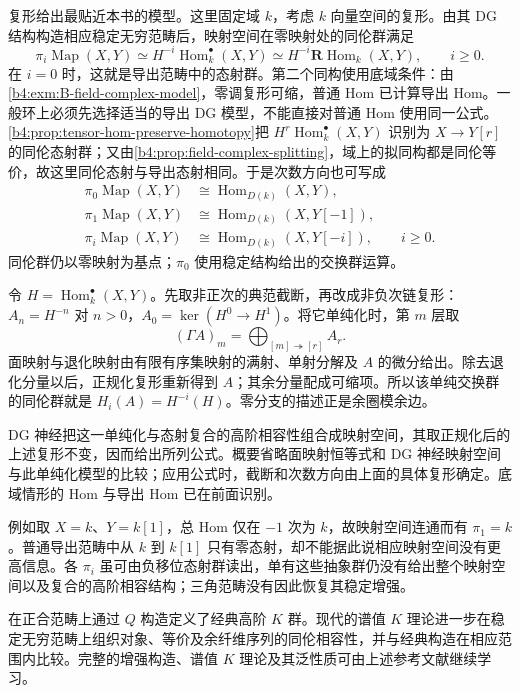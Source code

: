 复形给出最贴近本书的模型。这里固定域 \(k\)，考虑 \(k\) 向量空间的复形。由其 DG 结构构造相应稳定无穷范畴后，映射空间在零映射处的同伦群满足
\[
	\pi_i\operatorname{Map}(X,Y) \simeq H^{-i}\operatorname{Hom}_k^\bullet(X,Y) \simeq H^{-i}\mathbf R\operatorname{Hom}_k(X,Y), \qquad i\ge0.
\]
在 \(i=0\) 时，这就是导出范畴中的态射群。第二个同构使用底域条件：由\cref{b4:exm:B-field-complex-model}，零调复形可缩，普通 Hom 已计算导出 Hom。一般环上必须先选择适当的导出 DG 模型，不能直接对普通 Hom 使用同一公式。 \cref{b4:prop:tensor-hom-preserve-homotopy}把 \(H^r\operatorname{Hom}_k^\bullet(X,Y)\) 识别为 \(X\to Y[r]\) 的同伦态射群；又由\cref{b4:prop:field-complex-splitting}，域上的拟同构都是同伦等价，故这里同伦态射与导出态射相同。于是次数方向也可写成
\[
	\begin{aligned}
		\pi_0\operatorname{Map}(X,Y) &\cong\operatorname{Hom}_{D(k)}(X,Y),\\
		\pi_1\operatorname{Map}(X,Y) &\cong\operatorname{Hom}_{D(k)}(X,Y[-1]),\\
		\pi_i\operatorname{Map}(X,Y) &\cong\operatorname{Hom}_{D(k)}(X,Y[-i]),\qquad i\ge0.
	\end{aligned}
\]
同伦群仍以零映射为基点；\(\pi_0\) 使用稳定结构给出的交换群运算。
\begin{proofsketch}
	令 \(H=\operatorname{Hom}_k^\bullet(X,Y)\)。先取非正次的典范截断，再改成非负次链复形：\(A_n=H^{-n}\) 对 \(n>0\)，\(A_0=\ker(H^0\to H^1)\)。将它单纯化时，第 \(m\) 层取
	\[
		(\Gamma A)_m=\bigoplus_{[m]\twoheadrightarrow[r]}A_r.
	\]
	面映射与退化映射由有限有序集映射的满射、单射分解及 \(A\) 的微分给出。除去退化分量以后，正规化复形重新得到 \(A\)；其余分量配成可缩项。所以该单纯交换群的同伦群就是 \(H_i(A)=H^{-i}(H)\)。零分支的描述正是余圈模余边。

	DG 神经把这一单纯化与态射复合的高阶相容性组合成映射空间，其取正规化后的上述复形不变，因而给出所列公式。概要省略面映射恒等式和 DG 神经映射空间与此单纯化模型的比较；应用公式时，截断和次数方向由上面的具体复形确定。底域情形的 Hom 与导出 Hom 已在前面识别。
\end{proofsketch}

例如取 \(X=k\)、\(Y=k[1]\)，总 Hom 仅在 \(-1\) 次为 \(k\)，故映射空间连通而有 \(\pi_1=k\)。普通导出范畴中从 \(k\) 到 \(k[1]\) 只有零态射，却不能据此说相应映射空间没有更高信息。各 \(\pi_i\) 虽可由负移位态射群读出，单有这些抽象群仍没有给出整个映射空间以及复合的高阶相容结构；三角范畴没有因此恢复其稳定增强。

\ProseParagraphBreak
{}在正合范畴上通过 \(Q\) 构造定义了经典高阶 \(K\) 群。现代的谱值 \(K\) 理论进一步在稳定无穷范畴上组织对象、等价及余纤维序列的同伦相容性，并与经典构造在相应范围内比较。完整的增强构造、谱值 \(K\) 理论及其泛性质可由上述参考文献继续学习。


